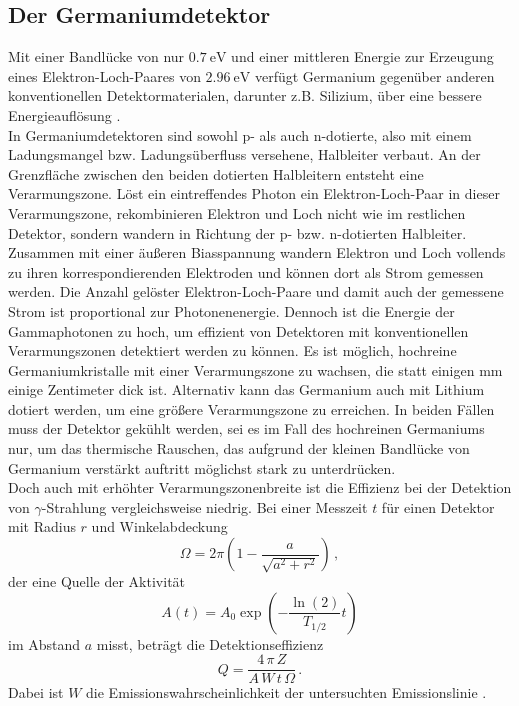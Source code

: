 \subsection{Der Germaniumdetektor}

Mit einer Bandlücke von nur $\SI{0,7}{\eV}$ und einer mittleren Energie zur Erzeugung eines Elektron-Loch-Paares von $\SI{2,96}{\eV}$ verfügt Germanium gegenüber anderen
konventionellen Detektormaterialen, darunter z.B. Silizium, über eine bessere Energieauflösung \cite{Teilchendetektoren}. \\
In Germaniumdetektoren sind sowohl p- als auch n-dotierte, also mit einem Ladungsmangel bzw. Ladungsüberfluss versehene, 
Halbleiter verbaut.
An der Grenzfläche zwischen den beiden dotierten Halbleitern entsteht eine Verarmungszone. 
Löst ein eintreffendes Photon ein Elektron-Loch-Paar in dieser Verarmungszone,
rekombinieren Elektron und Loch nicht wie im restlichen Detektor, sondern wandern in Richtung der p- bzw. n-dotierten Halbleiter.
Zusammen mit einer äußeren Biasspannung wandern Elektron und Loch vollends zu ihren korrespondierenden Elektroden und können dort als Strom gemessen werden.
Die Anzahl gelöster Elektron-Loch-Paare und damit auch der gemessene Strom ist proportional zur Photonenenergie.
Dennoch ist die Energie der Gammaphotonen zu hoch, um effizient von Detektoren mit konventionellen Verarmungszonen detektiert werden zu können.
Es ist möglich, hochreine Germaniumkristalle mit einer Verarmungszone zu wachsen, die statt einigen $\si{\milli\meter}$ einige Zentimeter dick ist.
Alternativ kann das Germanium auch mit Lithium dotiert werden, um eine größere Verarmungszone zu erreichen.
In beiden Fällen muss der Detektor gekühlt werden, sei es im Fall des hochreinen Germaniums nur, um das thermische Rauschen,
das aufgrund der kleinen Bandlücke von Germanium verstärkt auftritt möglichst stark zu unterdrücken. \\

Doch auch mit erhöhter Verarmungszonenbreite ist die Effizienz bei der Detektion von $\gamma$-Strahlung vergleichsweise niedrig.
Bei einer Messzeit $t$ für einen Detektor mit Radius $r$ und Winkelabdeckung
\begin{equation*}
    \Omega = 2 \pi \left(1 - \frac{a}{\sqrt{a^2 + r^2}}\right) \,,
\end{equation*}
der eine Quelle der Aktivität
\begin{equation*}
    A(t) = A_0 \exp \left(-\frac{\ln(2)}{T_{1/2}} t \right)
\end{equation*}
im Abstand $a$ misst, beträgt die Detektionseffizienz
\begin{equation}
    Q = \frac{4 \, \pi \, Z}{A \, W \, t \, \Omega} \,.
\end{equation}
Dabei ist $W$ die Emissionswahrscheinlichkeit der untersuchten Emissionslinie \cite{gamma}.

